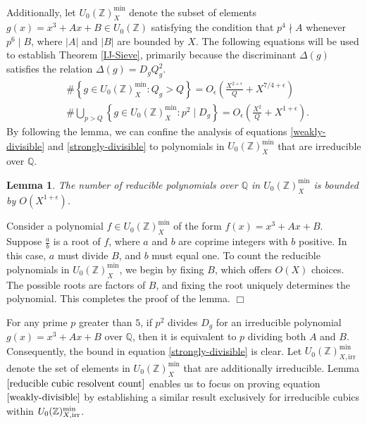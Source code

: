 \documentclass{article}
\def\Z{{\mathbb Z}}
\def\irr{{\rm irr}}
\def\Q{{\mathbb Q}}
\def\Z{{\mathbb Z}}
\def\Q{{\mathbb Q}}
\newtheorem{lemma}[theorem]{Lemma}
\newenvironment{proof}{\noindent {\bf Proof:}}{$\Box$ \vspace{2 ex}}
\begin{document}
Additionally, let $U_0(\mathbb{Z})_{X}^{\min}$ denote the subset of elements $g(x) = x^3 + Ax + B \in U_0(\mathbb{Z})$ satisfying the condition that $p^4 \nmid A$ whenever $p^6 \mid B$, where $|A|$ and $|B|$ are bounded by $X$. The following equations will be used to establish Theorem \ref{IJ-Sieve}, primarily because the discriminant $\Delta(g)$ satisfies the relation $\Delta(g) = D_g Q_g^2$.
\begin{align}
& \# \left\{g \in U_0(\Z)_{X}^{\min}: Q_g>Q\right\}=  O_{\epsilon}\left(\frac{X^{2+\epsilon}}{Q}+X^{7/4+\epsilon}\right) \label{weakly-divisible}\\
& \#\bigcup_{p>Q} \left\{g \in U_0(\Z)_{X}^{\min}: p^2 \mid D_g\right\}=O_{\epsilon}\left(\frac{X^{2}}{Q}+X^{1+\epsilon}\right) \label{strongly-divisible}.
\end{align}
By following the lemma, we can confine the analysis of equations \eqref{weakly-divisible} and \eqref{strongly-divisible} to polynomials in $U_0(\Z)_{X}^{\min}$ that are irreducible over $\Q$.

\begin{lemma}\label{reducible cubic resolvent count}
The number of reducible polynomials over $\mathbb{Q}$ in $U_0(\mathbb{Z})_{X}^{\min}$ is bounded by $O(X^{1+\epsilon})$.
\end{lemma}
\begin{proof}
Consider a polynomial $f \in U_0(\mathbb{Z})_X^{\text{min}}$ of the form $f(x) = x^3 + Ax + B$. Suppose $\frac{a}{b}$ is a root of $f$, where $a$ and $b$ are coprime integers with $b$ positive. In this case, $a$ must divide $B$, and $b$ must equal one. To count the reducible polynomials in $U_0(\mathbb{Z})_X^{\text{min}}$, we begin by fixing $B$, which offers $O(X)$ choices. The possible roots are factors of $B$, and fixing the root uniquely determines the polynomial. This completes the proof of the lemma.
\end{proof}

For any prime $p$ greater than $5$, if $p^2$ divides $D_g$ for an irreducible polynomial $g(x)=x^3+Ax+B$ over $\Q$, then it is equivalent to $p$ dividing both $A$ and $B$. Consequently, the bound in equation \eqref{strongly-divisible} is clear.
Let $U_0(\mathbb{Z})_{X,\text{irr}}^{\text{min}}$ denote the set of elements in $U_0(\mathbb{Z})_{X}^{\text{min}}$ that are additionally irreducible. Lemma $\ref{reducible cubic resolvent count}$ enables us to focus on proving equation $\eqref{weakly-divisible}$ by establishing a similar result exclusively for irreducible cubics within $U_0(\mathbb{Z})_{X, \irr}^{\text{min}}$.
\end{document}

